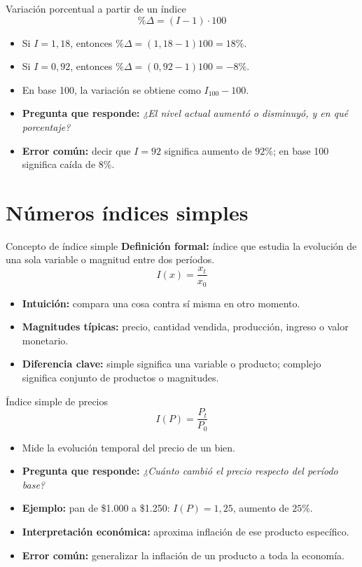 \documentclass[aspectratio=169,11pt]{beamer}
\newcommand{\pregunta}[1]{\textbf{Pregunta que responde:} \emph{#1}}
\newcommand{\errorcomun}[1]{\textbf{Error común:} #1}
\newcommand{\diferencia}[1]{\textbf{Diferencia clave:} #1}
\newcommand{\intuicion}[1]{\textbf{Intuición:} #1}
\begin{document}
\begin{frame}{Variación porcentual a partir de un índice}
\[
\%\Delta=(I-1)\cdot 100
\]
\begin{itemize}
  \item Si $I=1{,}18$, entonces $\%\Delta=(1{,}18-1)100=18\%$.
  \item Si $I=0{,}92$, entonces $\%\Delta=(0{,}92-1)100=-8\%$.
  \item En base 100, la variación se obtiene como $I_{100}-100$.
  \item \pregunta{¿El nivel actual aumentó o disminuyó, y en qué porcentaje?}
  \item \errorcomun{decir que $I=92$ significa aumento de $92\%$; en base 100 significa caída de $8\%$.}
\end{itemize}
\end{frame}

\section{Números índices simples}

\begin{frame}{Concepto de índice simple}
\textbf{Definición formal:} índice que estudia la evolución de una sola variable o magnitud entre dos períodos.
\[
I(x)=\frac{x_t}{x_0}
\]
\begin{itemize}
  \item \intuicion{compara una cosa contra sí misma en otro momento.}
  \item \textbf{Magnitudes típicas:} precio, cantidad vendida, producción, ingreso o valor monetario.
  \item \diferencia{simple significa una variable o producto; complejo significa conjunto de productos o magnitudes.}
\end{itemize}
\end{frame}

\begin{frame}{Índice simple de precios}
\[
I(P)=\frac{P_t}{P_0}
\]
\begin{itemize}
  \item Mide la evolución temporal del precio de un bien.
  \item \pregunta{¿Cuánto cambió el precio respecto del período base?}
  \item \textbf{Ejemplo:} pan de \$1.000 a \$1.250: $I(P)=1{,}25$, aumento de $25\%$.
  \item \textbf{Interpretación económica:} aproxima inflación de ese producto específico.
  \item \errorcomun{generalizar la inflación de un producto a toda la economía.}
\end{itemize}
\end{frame}
\end{document}
